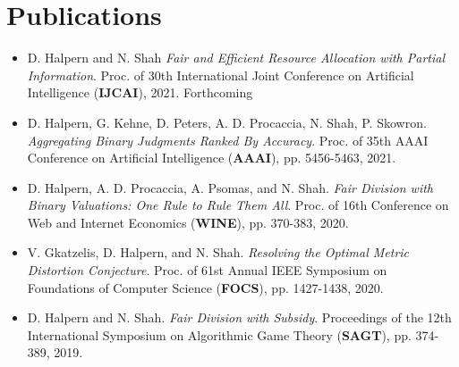 \documentclass{article}
\begin{document}
    \section{Publications}
    \begin{itemize}
        \setlength\itemsep{1.3ex}
        \item D. Halpern and N. Shah \textit{Fair and Efficient Resource Allocation with Partial Information}.
        Proc. of 30th International Joint Conference on Artificial Intelligence (\textbf{IJCAI}), 2021. Forthcoming
        
        \item D. Halpern, G. Kehne, D. Peters, A. D. Procaccia, N. Shah, P. Skowron. \textit{Aggregating Binary Judgments Ranked By Accuracy}.
        Proc. of 35th AAAI Conference on Artificial Intelligence (\textbf{AAAI}), pp. 5456-5463, 2021. 

        \item D. Halpern, A. D. Procaccia, A. Psomas, and N. Shah. \textit{Fair Division with Binary Valuations: One
        Rule to Rule
        Them All}. Proc. of 16th Conference on Web and Internet Economics (\textbf{WINE}), pp. 370-383, 2020.
        
        \item V. Gkatzelis, D. Halpern, and N. Shah. \textit{Resolving the Optimal Metric Distortion Conjecture}.
        Proc. of 61st Annual IEEE Symposium on Foundations of Computer Science (\textbf{FOCS}), pp. 1427-1438, 2020.

        \item D. Halpern and N. Shah. \textit{Fair Division with Subsidy}. Proceedings of the 12th International Symposium on
        Algorithmic Game Theory (\textbf{SAGT}), pp. 374-389, 2019.

    \end{itemize}
\end{document}
